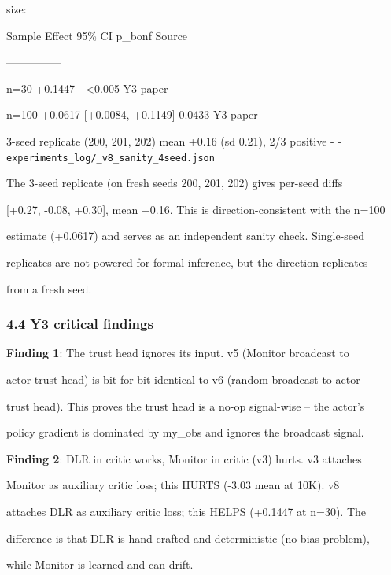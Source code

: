 \documentclass[11pt]{article}
\begin{document}
size:

Sample \textbar{} Effect \textbar{} 95\% CI \textbar{} p\_bonf
\textbar{} Source \textbar{}

\textbar---\textbar---\textbar---\textbar---\textbar---\textbar{}

n=30 \textbar{} +0.1447 \textbar{} - \textbar{} \textless0.005
\textbar{} Y3 paper \textbar{}

n=100 \textbar{} +0.0617 \textbar{} {[}+0.0084, +0.1149{]} \textbar{}
0.0433 \textbar{} Y3 paper \textbar{}

3-seed replicate (200, 201, 202) \textbar{} mean +0.16 (sd 0.21), 2/3
positive \textbar{} - \textbar{} - \textbar{}
\texttt{experiments\_log/\_v8\_sanity\_4seed.json} \textbar{}

The 3-seed replicate (on fresh seeds 200, 201, 202) gives per-seed diffs

{[}+0.27, -0.08, +0.30{]}, mean +0.16. This is direction-consistent with
the n=100

estimate (+0.0617) and serves as an independent sanity check.
Single-seed

replicates are not powered for formal inference, but the direction
replicates

from a fresh seed.

\subsubsection{4.4 Y3 critical findings}\label{y3-critical-findings}

\textbf{Finding 1}: The trust head ignores its input. v5 (Monitor
broadcast to

actor trust head) is bit-for-bit identical to v6 (random broadcast to
actor

trust head). This proves the trust head is a no-op signal-wise -- the
actor's

policy gradient is dominated by my\_obs and ignores the broadcast
signal.

\textbf{Finding 2}: DLR in critic works, Monitor in critic (v3) hurts.
v3 attaches

Monitor as auxiliary critic loss; this HURTS (-3.03 mean at 10K). v8

attaches DLR as auxiliary critic loss; this HELPS (+0.1447 at n=30). The

difference is that DLR is hand-crafted and deterministic (no bias
problem),

while Monitor is learned and can drift.
\end{document}
